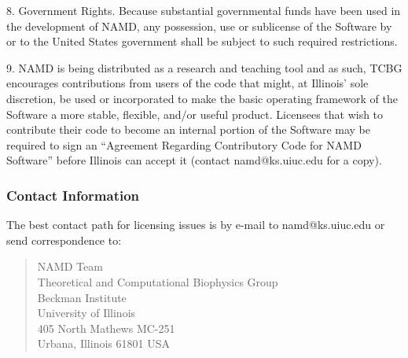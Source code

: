 8. Government Rights. Because substantial governmental funds have been 
used in the development of NAMD, any possession, use or sublicense of 
the Software by or to the United States government shall be subject 
to such required restrictions.

9. NAMD is being distributed as a research and teaching tool and as such, 
TCBG encourages contributions from users of the code that might, at 
Illinois' sole discretion, be used or incorporated to make the basic 
operating framework of the Software a more stable, flexible, and/or 
useful product. Licensees that wish to contribute their code to become 
an internal portion of the Software may be required to sign an 
``Agreement Regarding Contributory Code for NAMD Software''
before Illinois can accept it (contact namd@ks.uiuc.edu for a copy).

\newpage
\subsubsection*{Contact Information}

The best contact path for licensing issues is by e-mail to namd@ks.uiuc.edu
or send correspondence to:
\begin{verse}
                             NAMD Team\\
                             Theoretical and Computational Biophysics Group\\
                             Beckman Institute\\
                             University of Illinois\\
                             405 North Mathews MC-251\\
                             Urbana, Illinois 61801 USA
\end{verse}


